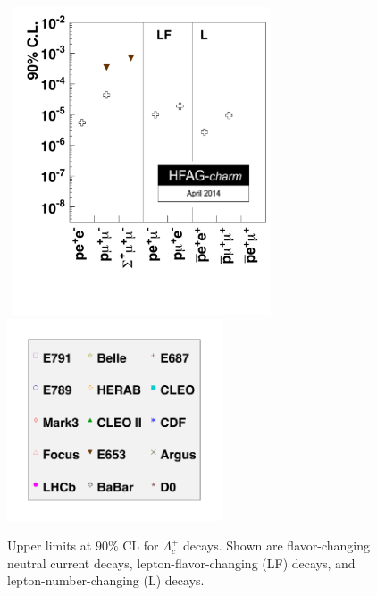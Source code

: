 \begin{figure}
\begin{center}
\hbox{
\includegraphics[width=3.0in]{figures/charm/rare_Lambdac.pdf}
\hskip-1.80in
\vbox{
\includegraphics[width=2.5in]{figures/charm/rare_leg_all.pdf}
\vskip1.2in
}}
\vskip-0.20in
\caption{Upper limits at $90\%$ CL for $\Lambda_c^+$ decays. Shown are 
flavor-changing neutral current decays, lepton-flavor-changing (LF) 
decays, and lepton-number-changing (L) decays. }
\label{fig:charm:lambdac}
\end{center}
\end{figure}


